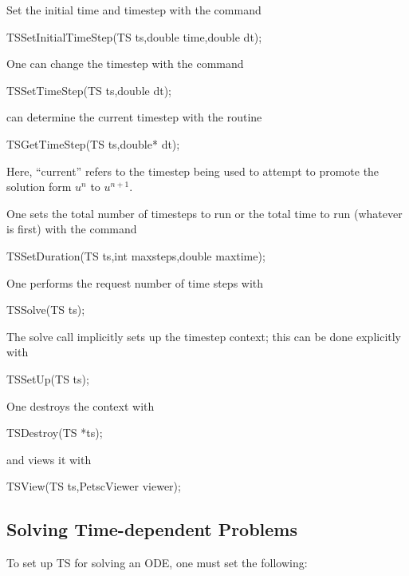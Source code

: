 Set the initial time and timestep with the command
\begin{tabbing}
 TSSetInitialTimeStep(TS ts,double time,double dt);
\end{tabbing}
One can change the timestep with the command
\begin{tabbing}
 TSSetTimeStep(TS ts,double dt);
\end{tabbing}
can determine the current timestep with the routine
\begin{tabbing}
 TSGetTimeStep(TS ts,double* dt);
\end{tabbing}
Here, ``current'' refers to the timestep being used to attempt to
promote the solution form $ u^n $ to $ u^{n+1}. $

One sets the total number of timesteps to run or the total time to run 
(whatever is first) with the command 
\begin{tabbing}
 TSSetDuration(TS ts,int maxsteps,double maxtime);
\end{tabbing}
One performs the request number of time steps with
\begin{tabbing}
  TSSolve(TS ts);
\end{tabbing}
The solve call implicitly sets up the timestep context;
this can be done explicitly with
\begin{tabbing}
 TSSetUp(TS ts);
\end{tabbing}
One destroys the context with
\begin{tabbing}
 TSDestroy(TS *ts);
\end{tabbing}
and views it with 
\begin{tabbing}
 TSView(TS ts,PetscViewer viewer);
\end{tabbing}

\subsection{Solving Time-dependent Problems}
To set up TS for solving an ODE, one must set the following:

